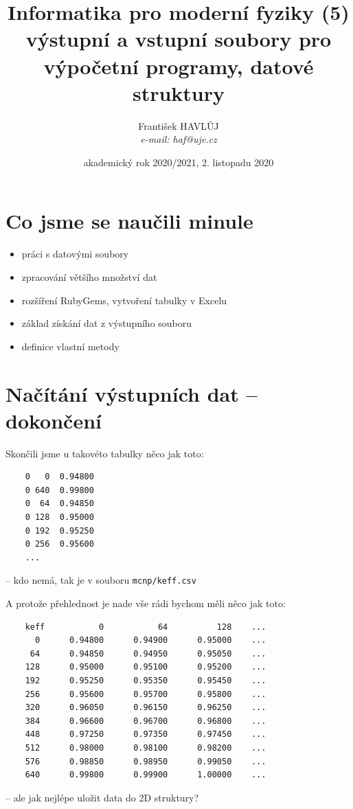 \documentclass{beamer}
\title[IMF (5)]{Informatika pro moderní fyziky (5)\\výstupní a vstupní soubory pro výpočetní programy, datové struktury}
\author[Franti\v{s}ek HAVL\r{U}J, ORF ÚJV Řež]{Franti\v{s}ek HAVL\r{U}J\\{\scriptsize \emph{e-mail: haf@ujv.cz}}}
\date{akademický rok 2020/2021, 2. listopadu 2020}
\institute[ORF ÚJV Řež]
{ÚJV Řež\\oddělení Reaktorové fyziky a podpory palivového cyklu}
\begin{document}
\begin{frame}
  \titlepage
\end{frame}

\begin{frame}
  \tableofcontents
\end{frame}

\section{Co jsme se naučili minule}

\begin{frame}{}
  \begin{itemize}
    \item práci s datovými soubory
    \item zpracování většího množství dat
    \item rozšíření RubyGems, vytvoření tabulky v Excelu
    \item základ získání dat z výstupního souboru
    \item definice vlastní metody
  \end{itemize}
\end{frame}

\section{Načítání výstupních dat – dokončení}

\begin{frame}[fragile]{Skončili jsme u takovéto tabulky}
  něco jak toto:
  {\scriptsize
  \begin{verbatim}
    0   0  0.94800
    0 640  0.99800
    0  64  0.94850
    0 128  0.95000
    0 192  0.95250
    0 256  0.95600
    ...
  \end{verbatim}
  }
  -- kdo nemá, tak je v souboru \texttt{mcnp/keff.csv}
\end{frame}

\begin{frame}[fragile]{A protože přehlednost je nade vše}
  rádi bychom měli něco jak toto:
  {\scriptsize
  \begin{verbatim}
    keff           0           64          128    ...
      0      0.94800      0.94900      0.95000    ...
     64      0.94850      0.94950      0.95050    ...
    128      0.95000      0.95100      0.95200    ...
    192      0.95250      0.95350      0.95450    ...
    256      0.95600      0.95700      0.95800    ...
    320      0.96050      0.96150      0.96250    ...
    384      0.96600      0.96700      0.96800    ...
    448      0.97250      0.97350      0.97450    ...
    512      0.98000      0.98100      0.98200    ...
    576      0.98850      0.98950      0.99050    ...
    640      0.99800      0.99900      1.00000    ...
  \end{verbatim}
  }
  -- ale jak nejlépe uložit data do 2D struktury?
\end{frame}
\end{document}
